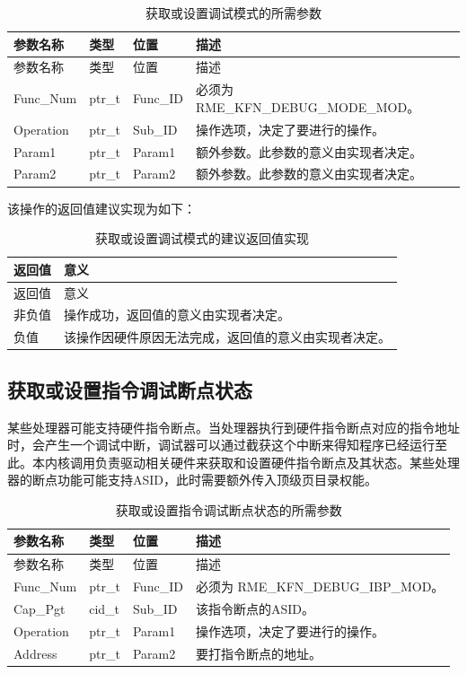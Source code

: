 \begin{xltabular}{\textwidth}{@{}>{\hsize\raggedright\arraybackslash}X>{\hsize\raggedright\arraybackslash}X>{\hsize\raggedright\arraybackslash}X>{\hsize\raggedright\arraybackslash}X@{}}
\caption{获取或设置调试模式的所需参数}\label{tab:8-117-get-or-set-debug-mode-parameters}\\
\toprule
参数名称 & 类型 & 位置 & 描述\tabularnewline
\endfirsthead
\toprule
参数名称 & 类型 & 位置 & 描述\tabularnewline
\midrule
\endhead
\bottomrule
\endlastfoot
Func\_Num & ptr\_t & Func\_ID & 必须为 RME\_KFN\_DEBUG\_MODE\_MOD。\tabularnewline
Operation & ptr\_t & Sub\_ID &
操作选项，决定了要进行的操作。\tabularnewline
Param1 & ptr\_t & Param1 &
额外参数。此参数的意义由实现者决定。\tabularnewline
Param2 & ptr\_t & Param2 &
额外参数。此参数的意义由实现者决定。\tabularnewline
\end{xltabular}

该操作的返回值建议实现为如下：

\begin{xltabular}{\textwidth}{@{}>{\hsize\raggedright\arraybackslash}X>{\hsize\raggedright\arraybackslash}X@{}}
\caption{获取或设置调试模式的建议返回值实现}\label{tab:8-118-get-or-set-debug-mode-suggested-return-values}\\
\toprule
返回值 & 意义\tabularnewline
\endfirsthead
\toprule
返回值 & 意义\tabularnewline
\midrule
\endhead
\bottomrule
\endlastfoot
    非负值 & 操作成功，返回值的意义由实现者决定。\tabularnewline
    负值 & 该操作因硬件原因无法完成，返回值的意义由实现者决定。\tabularnewline
\end{xltabular}

\subsection{获取或设置指令调试断点状态}\label{subsec:8-get-or-set-instruction-breakpoint-state}

某些处理器可能支持硬件指令断点。当处理器执行到硬件指令断点对应的指令地址时，会产生一个调试中断，调试器可以通过截获这个中断来得知程序已经运行至此。本内核调用负责驱动相关硬件来获取和设置硬件指令断点及其状态。某些处理器的断点功能可能支持ASID，此时需要额外传入顶级页目录权能。

\begin{xltabular}{\textwidth}{@{}>{\hsize\raggedright\arraybackslash}X>{\hsize\raggedright\arraybackslash}X>{\hsize\raggedright\arraybackslash}X>{\hsize\raggedright\arraybackslash}X@{}}
\caption{获取或设置指令调试断点状态的所需参数}\label{tab:8-119-get-or-set-instruction-breakpoint-state-parameters}\\
\toprule
参数名称 & 类型 & 位置 & 描述\tabularnewline
\endfirsthead
\toprule
参数名称 & 类型 & 位置 & 描述\tabularnewline
\midrule
\endhead
\bottomrule
\endlastfoot
Func\_Num & ptr\_t & Func\_ID & 必须为 RME\_KFN\_DEBUG\_IBP\_MOD。\tabularnewline
Cap\_Pgt & cid\_t & Sub\_ID & 该指令断点的ASID。\tabularnewline
Operation & ptr\_t & Param1 &
操作选项，决定了要进行的操作。\tabularnewline
Address & ptr\_t & Param2 & 要打指令断点的地址。\tabularnewline
\end{xltabular}

